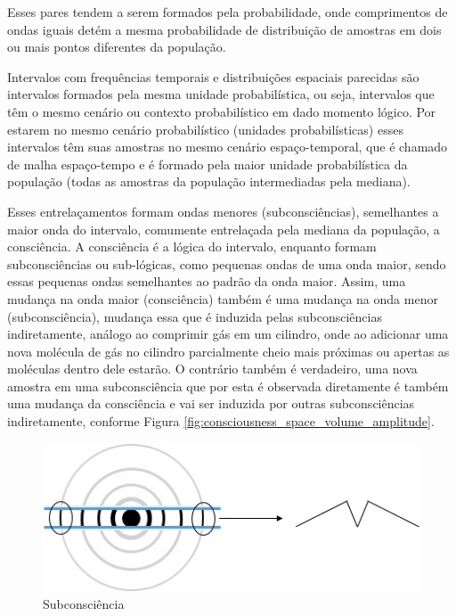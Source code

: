Esses pares tendem a serem formados pela probabilidade, onde comprimentos de ondas iguais detém a mesma probabilidade de distribuição de amostras em dois ou mais pontos diferentes da população. 

Intervalos com frequências temporais e distribuições espaciais parecidas são intervalos formados pela mesma unidade probabilística, ou seja, intervalos que têm o mesmo cenário ou contexto probabilístico em dado momento lógico. Por estarem no mesmo cenário probabilístico (unidades probabilísticas) esses intervalos têm suas amostras no mesmo cenário espaço-temporal, que é chamado de malha espaço-tempo e é formado pela maior unidade probabilística da população (todas as amostras da população intermediadas pela mediana). 

Esses entrelaçamentos formam ondas menores (subconsciências), semelhantes a maior onda do intervalo, comumente entrelaçada pela mediana da população, a consciência. A consciência é a lógica do intervalo, enquanto formam subconsciências ou sub-lógicas, como pequenas ondas de uma onda maior, sendo essas pequenas ondas semelhantes ao padrão da onda maior. Assim, uma mudança na onda maior (consciência) também é uma mudança na onda menor (subconsciência), mudança essa que é induzida pelas subconsciências indiretamente, análogo ao comprimir gás em um cilindro, onde ao adicionar uma nova molécula de gás no cilindro parcialmente cheio mais próximas ou apertas as moléculas dentro dele estarão. O contrário também é verdadeiro, uma nova amostra em uma subconsciência que por esta é observada diretamente é também uma mudança da consciência e vai ser induzida por outras subconsciências indiretamente, conforme Figura \ref{fig:consciousness_space_volume_amplitude}.
	\begin{figure}[H]
	\caption{Subconsciência}
	\label{fig:consciousness_subconscious}
	\centering
	\includegraphics[scale=.8]{sections/images/consciousness_subconscious.jpg}
	\end{figure}
	
